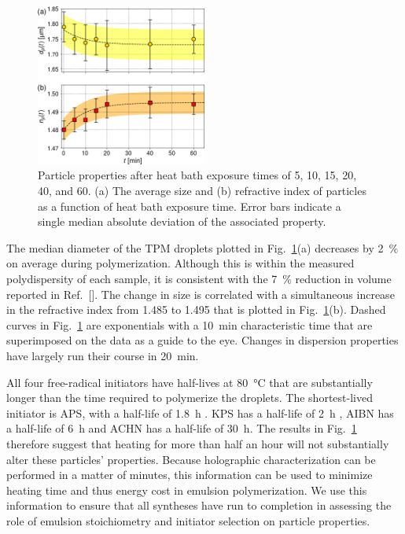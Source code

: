 \documentclass[journal=langd5,manuscript=article]{achemso}
\begin{document}
\begin{figure}
  \centering
  \includegraphics[width=0.5\textwidth]{polymerization04}
  \caption{Particle properties after heat bath exposure times
    of \num{5}, \num{10}, \num{15}, \num{20}, \num{40}, and 
    \SI{60}{\min}.
    (a) The average size and (b) refractive index of particles as a function
    of heat bath exposure time.
    Error bars indicate a single median absolute deviation
    of the associated property.}
  \label{fig:heat_size_time}
\end{figure}

The median diameter of the TPM droplets plotted
in Fig.~\ref{fig:heat_size_time}(a)
decreases by \SI{2}{\percent} on average
during polymerization.
Although this is within the
measured polydispersity of each sample, 
it is consistent with the \SI{7}{\percent} reduction
in volume reported in Ref.~[{\hspace*{-1ex}}].
The change in size is correlated with 
a simultaneous increase in the refractive index
from \num{1.485} to \num{1.495} that is
plotted in Fig.~\ref{fig:heat_size_time}(b).
Dashed curves in Fig.~\ref{fig:heat_size_time}
are exponentials with a \SI{10}{\minute} characteristic
time that are superimposed on the data as a guide
to the eye.
Changes in dispersion properties have largely run
their course in \SI{20}{\minute}.

All four free-radical initiators have half-lives
at \SI{80}{\degreeCelsius} that are substantially longer
than the time required to polymerize the droplets.
The shortest-lived initiator is APS, with a half-life
of \SI{1.8}{\hour} \cite{borisov2015kinetic}.
KPS has a half-life of \SI{2}{\hour} \cite{beylerian2002kinetics},
AIBN has a half-life of
\SI{6}{\hour} and ACHN has a half-life of \SI{30}{\hour}.
The results in Fig.~\ref{fig:heat_size_time} therefore
suggest that heating for more than half an hour
will not substantially alter these particles'
properties.
Because holographic characterization can be performed
in a matter of minutes, this
information can be used to minimize heating time
and thus energy cost in emulsion polymerization.
We use this information to ensure that all syntheses
have run to completion in assessing the
role of emulsion stoichiometry and initiator
selection on particle properties.
\end{document}
